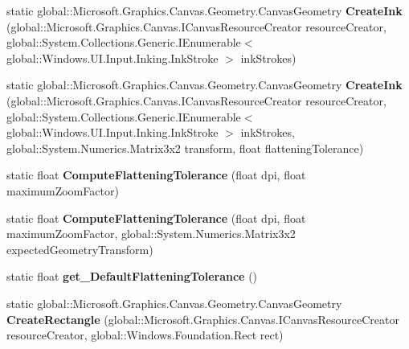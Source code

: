 \begin{DoxyCompactItemize}
static global\+::\+Microsoft.\+Graphics.\+Canvas.\+Geometry.\+Canvas\+Geometry {\bfseries Create\+Ink} (global\+::\+Microsoft.\+Graphics.\+Canvas.\+I\+Canvas\+Resource\+Creator resource\+Creator, global\+::\+System.\+Collections.\+Generic.\+I\+Enumerable$<$ global\+::\+Windows.\+U\+I.\+Input.\+Inking.\+Ink\+Stroke $>$ ink\+Strokes)
\item 
\mbox{\label{class_microsoft_1_1_graphics_1_1_canvas_1_1_geometry_1_1_canvas_geometry_a2ab66ac5c29e306f56d21b3368d42415}} 
static global\+::\+Microsoft.\+Graphics.\+Canvas.\+Geometry.\+Canvas\+Geometry {\bfseries Create\+Ink} (global\+::\+Microsoft.\+Graphics.\+Canvas.\+I\+Canvas\+Resource\+Creator resource\+Creator, global\+::\+System.\+Collections.\+Generic.\+I\+Enumerable$<$ global\+::\+Windows.\+U\+I.\+Input.\+Inking.\+Ink\+Stroke $>$ ink\+Strokes, global\+::\+System.\+Numerics.\+Matrix3x2 transform, float flattening\+Tolerance)
\item 
\mbox{\label{class_microsoft_1_1_graphics_1_1_canvas_1_1_geometry_1_1_canvas_geometry_af0a58e1e6450e34081143a65770bb043}} 
static float {\bfseries Compute\+Flattening\+Tolerance} (float dpi, float maximum\+Zoom\+Factor)
\item 
\mbox{\label{class_microsoft_1_1_graphics_1_1_canvas_1_1_geometry_1_1_canvas_geometry_a4cab7234385475a4109d2dcdca24ca39}} 
static float {\bfseries Compute\+Flattening\+Tolerance} (float dpi, float maximum\+Zoom\+Factor, global\+::\+System.\+Numerics.\+Matrix3x2 expected\+Geometry\+Transform)
\item 
\mbox{\label{class_microsoft_1_1_graphics_1_1_canvas_1_1_geometry_1_1_canvas_geometry_aec4a5123b972fd4576fdd3ab85f59718}} 
static float {\bfseries get\+\_\+\+Default\+Flattening\+Tolerance} ()
\item 
\mbox{\label{class_microsoft_1_1_graphics_1_1_canvas_1_1_geometry_1_1_canvas_geometry_a660756502ddaec1e43624023d23a5c60}} 
static global\+::\+Microsoft.\+Graphics.\+Canvas.\+Geometry.\+Canvas\+Geometry {\bfseries Create\+Rectangle} (global\+::\+Microsoft.\+Graphics.\+Canvas.\+I\+Canvas\+Resource\+Creator resource\+Creator, global\+::\+Windows.\+Foundation.\+Rect rect)

\end{DoxyCompactItemize}
